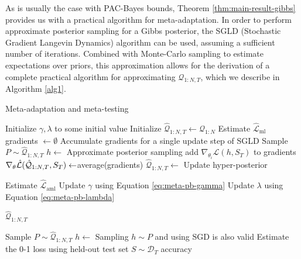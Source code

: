 \documentclass{article}
\theoremstyle{definition}
\begin{document}
As is usually the case with PAC-Bayes bounds, Theorem \ref{thm:main-result-gibbs} provides us with a practical algorithm for meta-adaptation. In order to perform approximate posterior sampling for a Gibbs posterior, the SGLD (Stochastic Gradient Langevin Dynamics) algorithm \citep{Welling2011} can be used, assuming a sufficient number of iterations.
Combined with Monte-Carlo sampling to estimate expectations over priors, 
this approximation allows for the derivation of a complete practical algorithm for approximating $\mathcal{Q}_{1:N,T}$, which we describe in Algorithm \ref{alg1}. 

\begin{algorithm}[H]
	\caption{Meta-adaptation and meta-testing}
	\label{alg1}
	\small
	\begin{algorithmic}
		\State Initialize $\gamma, \lambda$ to some initial value 
		\State Initialize $\hat{\mathcal{Q}}_{1:N, T}\leftarrow \mathcal{Q}_{1:N}$
		\State Estimate $\hat{\mathcal{L}}_{\mathrm{ml}}$
			\State gradients $\leftarrow \emptyset$ \Comment Accumulate gradients for a single update step of SGLD
				\State Sample $P\sim \hat{\mathcal{Q}}_{1:N, T}$
				\State $h\leftarrow$  \Comment Approximate posterior sampling
				\State add $\nabla_{\theta_i} \hat{\mathcal{L}}(h, S_T)$ to gradients
			\EndFor
			\State $\nabla_\theta \hat{\mathcal{L}}(\hat{\cal Q}_{1:N,T}, S_T)\leftarrow$average(gradients)
			\State $\hat{\mathcal{Q}}_{1:N, T}\leftarrow$  \Comment Update hyper-posterior
			
			\State Estimate $\hat{\mathcal{L}}_{\mathrm{aml}}$
			\State Update $\gamma$ using Equation \ref{eq:meta-pb-gamma}
			\State Update $\lambda$ using Equation \ref{eq:meta-pb-lambda}
			
		\EndWhile
		\State \Return $\hat{\mathcal{Q}}_{1:N, T}$
		\EndFunction
		
		\State Sample $P\sim \hat{\mathcal{Q}}_{1:N, T}$
		\State $h\leftarrow$  \Comment Sampling $h\sim P$ and using SGD is also valid
		\State Estimate the 0-1 loss using held-out test set $S\sim \mathcal{D}_T$
		\State \Return accuracy
		\EndFunction
	\end{algorithmic}
\end{algorithm}
\end{document}
